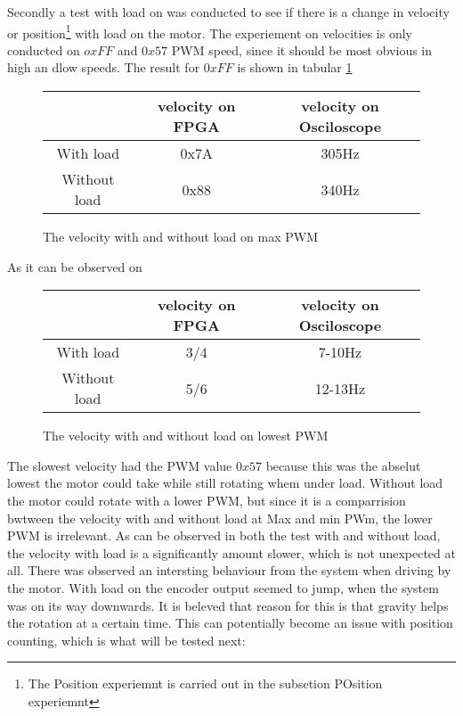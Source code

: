 \documentclass[../main]{subfiles}
\begin{document}
Secondly a test with load on was conducted to see if there is a change in velocity or position\footnote{The Position experiemnt is carried out in the subsetion POsition experiemnt} with load on the motor. The experiement on velocities is only conducted on $oxFF$ and $0x57$ PWM speed, since it should be most obvious in high an dlow speeds. The result for $0xFF$ is shown in tabular \ref{fig:max_speed}
\begin{figure}[H]
\begin{center}
\begin{tabular}{ c c c}
  & velocity on FPGA & velocity on Osciloscope \\
\hline
With load & 0x7A & 305Hz \\
Without load & 0x88  & 340Hz\\
\end{tabular}
\end{center}
\caption{The velocity with and without load on max PWM}
\label{fig:max_speed}
\end{figure}
As it can be observed on
\begin{figure}[H]
\begin{center}
\begin{tabular}{ c c c}
  & velocity on FPGA & velocity on Osciloscope \\
\hline
With load & 3/4 & 7-10Hz \\
Without load & 5/6  & 12-13Hz\\
\end{tabular}
\end{center}
\caption{The velocity with and without load on lowest PWM}
\label{fig:min_speed}
\end{figure}
The slowest velocity had the PWM value $0x57$ because this was the abselut lowest the motor could take while still rotating whem under load. Without load the motor could rotate with a lower PWM, but since it is a comparrision bwtween the velocity with and without load at Max and min PWm, the lower PWM is irrelevant. As can be observed in both the test with and without load, the velocity with load is a significantly amount slower, which is not unexpected at all. There was observed an intersting behaviour from the system when driving by the motor. With load on the encoder output seemed to jump, when the system was on its way downwards. It is beleved that reason for this is that gravity helps the rotation at a certain time. This can potentially become an issue with position counting, which is what will be tested next:
\end{document}
